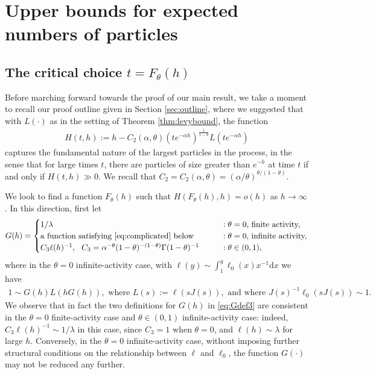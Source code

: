 \documentclass[a4,12pt]{amsart}
\numberwithin{equation}{section}
\begin{document}
\section{Upper bounds for expected numbers of particles} \label{sec:upper}

\subsection{The critical choice $t = F_\theta(h)$}

    Before marching forward towards the proof of our main result, we take a moment to recall our proof outline given in Section \ref{sec:outline}, where we suggested that with $L(\cdot)$ as in the setting of Theorem \ref{thm:levybound}, the function
    \begin{align} \label{eq:Hdef}
    H(t,h) := h - C_2(\alpha,\theta)(te^{-\alpha h})^{\frac{1}{1-\theta}} L(t e^{ - \alpha h} ) 
    \end{align}
    captures the fundamental nature of the largest particles in the process, in the sense that for large times $t$, there are particles of size greater than $e^{-h}$ at time $t$ if and only if $H(t,h) \gg 0$. We recall that $C_2=C_2(\alpha,\theta) = (\alpha/\theta)^{\theta/(1-\theta)}$. 
    
    We look to find a function $F_\theta(h)$ such that $H(F_\theta(h),h) = o(h)$ as $h \to \infty$. In this direction, first let 
    \begin{align} \label{eq:Gdef3}
    G(h) = 
    \begin{cases}
    1/\lambda \qquad &:\text{$\theta = 0$, finite activity,}\\
    \text{a function satisfying \eqref{eq:complicated} below} \qquad &:\text{$\theta = 0$, infinite activity,}\\
    C_3\ell(h)^{-1},\ \ C_3 = \alpha^{-\theta} (1-\theta)^{-(1-\theta)} \Gamma(1-\theta)^{-1} \qquad &:\text{$\theta \in (0,1)$},
    \end{cases} 
    \end{align}
    where in the $\theta = 0$ infinite-activity case, with $\ell(y) \sim \int_1^y \ell_0(x) x^{-1}\mathrm{d}x$ we have
    \begin{align} \label{eq:complicated}
    1 \sim G(h)L(hG(h)), \text{ where } L(s) := \ell(sJ(s)), \text{ and where } J(s)^{-1}\ell_0(sJ(s)) \sim 1.
    \end{align}
    We observe that in fact the two definitions for $G(h)$ in \eqref{eq:Gdef3} are consistent in the $\theta = 0$ finite-activity case and $\theta \in (0,1)$ infinite-activity case: indeed, $C_3\ell(h)^{-1} \sim 1/\lambda$ in this case, since $C_3=  1$ when $\theta = 0$, and $\ell(h) \sim \lambda$ for large $h$. Conversely, in the $\theta = 0$ infinite-activity case, without imposing further structural conditions on the relationship between $\ell$ and $\ell_0$, the function $G(\cdot)$ may not be reduced any further. 
\end{document}
